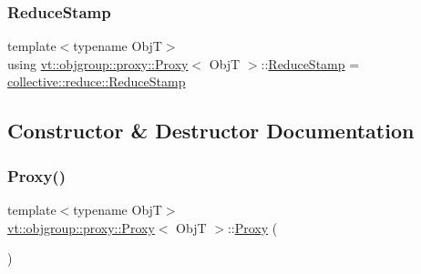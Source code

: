 \subsubsection{\texorpdfstring{Reduce\+Stamp}{ReduceStamp}}
{\footnotesize\ttfamily template$<$typename ObjT$>$ \\
using \hyperlink{structvt_1_1objgroup_1_1proxy_1_1_proxy}{vt\+::objgroup\+::proxy\+::\+Proxy}$<$ ObjT $>$\+::\hyperlink{structvt_1_1objgroup_1_1proxy_1_1_proxy_a337be4c20cf11ff6477c7a66208cc909}{Reduce\+Stamp} =  \hyperlink{namespacevt_1_1collective_1_1reduce_a7b7cb3021ac5654d92825d9fab0250b2}{collective\+::reduce\+::\+Reduce\+Stamp}}



\subsection{Constructor \& Destructor Documentation}
\mbox{\label{structvt_1_1objgroup_1_1proxy_1_1_proxy_a5450776d9cabb2556765c0d0227c9589}} 
\subsubsection{\texorpdfstring{Proxy()}{Proxy()}\hspace{0.1cm}{\footnotesize\ttfamily [1/4]}}
{\footnotesize\ttfamily template$<$typename ObjT$>$ \\
\hyperlink{structvt_1_1objgroup_1_1proxy_1_1_proxy}{vt\+::objgroup\+::proxy\+::\+Proxy}$<$ ObjT $>$\+::\hyperlink{structvt_1_1objgroup_1_1proxy_1_1_proxy}{Proxy} (\begin{DoxyParamCaption}{ }\end{DoxyParamCaption})\hspace{0.3cm}{\ttfamily [default]}}

\mbox{\label{structvt_1_1objgroup_1_1proxy_1_1_proxy_ad12a9b75a3c4844144d7a159b11af5ec}} 
